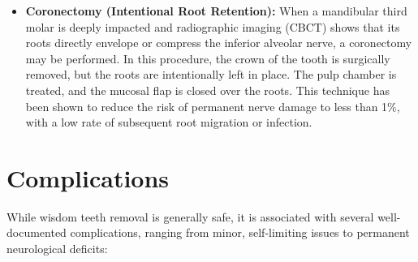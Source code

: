 \begin{itemize}
\begin{enumerate}
        \item Closure of the wound using sutures (often resorbable, such as chromic gut or vicryl).
    \end{enumerate}
    \item \textbf{Coronectomy (Intentional Root Retention):} When a mandibular third molar is deeply impacted and radiographic imaging (CBCT) shows that its roots directly envelope or compress the inferior alveolar nerve, a coronectomy may be performed. In this procedure, the crown of the tooth is surgically removed, but the roots are intentionally left in place. The pulp chamber is treated, and the mucosal flap is closed over the roots. This technique has been shown to reduce the risk of permanent nerve damage to less than 1\%, with a low rate of subsequent root migration or infection.
\end{itemize}

\section*{Complications}
While wisdom teeth removal is generally safe, it is associated with several well-documented complications, ranging from minor, self-limiting issues to permanent neurological deficits:

